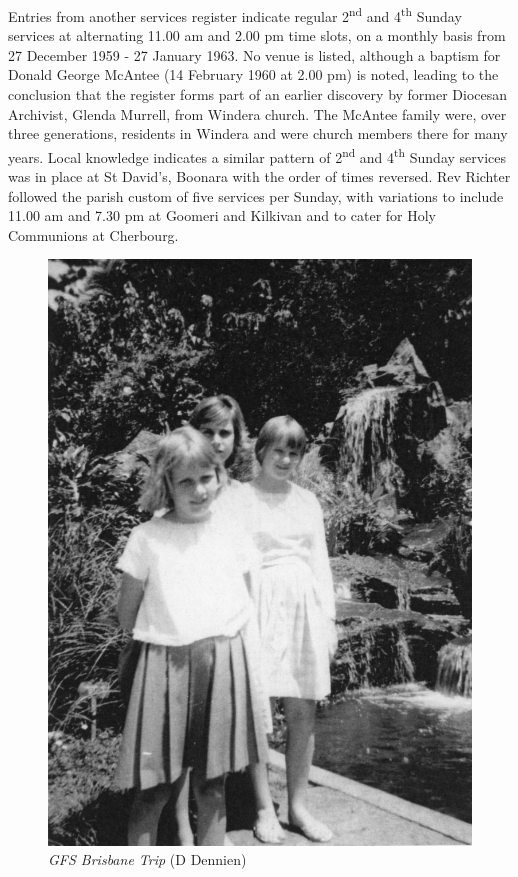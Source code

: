 Entries from another services register indicate regular 2\textsuperscript{nd} and 4\textsuperscript{th} Sunday services at alternating 11.00 am and 2.00 pm time slots, on a monthly basis from 27 December 1959 - 27 January 1963. No venue is listed, although a baptism for Donald George McAntee (14 February 1960 at 2.00 pm) is noted, leading to the conclusion that the register forms part of an earlier discovery by former Diocesan Archivist, Glenda Murrell, from Windera church. The McAntee family were, over three generations, residents in Windera and were church members there for many years. Local knowledge indicates a similar pattern of 2\textsuperscript{nd} and 4\textsuperscript{th} Sunday services was in place at St David's, Boonara with the order of times reversed. Rev Richter followed the parish custom of five services per Sunday, with variations to include 11.00 am and 7.30 pm at Goomeri and Kilkivan and to cater for Holy Communions at Cherbourg.









\begin{figure}
\begin{center}
\includegraphics[width=1.\linewidth,center]{../images/gfsBrisbaneTrip.jpg}
\caption{{\itshape GFS Brisbane Trip} {\scriptsize(D Dennien)}}
\end{center}
\end{figure}




